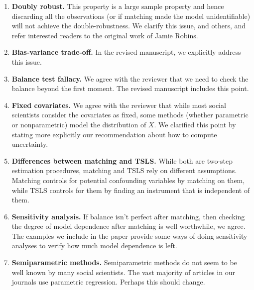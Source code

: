 \documentclass[11pt]{article}
\begin{document}
\begin{enumerate}
\item {\bf Doubly robust.} This property is a large sample property
  and hence discarding all the observations (or if matching made the
  model unidentifiable) will not achieve the double-robustness.  We
  clarify this issue, and others, and refer interested readers to the
  original work of Jamie Robins.
 
\item {\bf Bias-variance trade-off.} In the revised manuscript, we
  explicitly address this issue.

\item {\bf Balance test fallacy.} We agree with the reviewer that we
  need to check the balance beyond the first moment.  The revised
  manuscript includes this point.

\item {\bf Fixed covariates.} We agree with the reviewer that while
  most social scientists consider the covariates as fixed, some
  methods (whether parametric or nonparametric) model the distribution
  of $X$. We clarified this point by stating more explicitly our
  recommendation about how to compute uncertainty.

\item {\bf Differences between matching and TSLS.} While both are
  two-step estimation procedures, matching and TSLS rely on different
  assumptions. Matching controls for potential confounding variables
  by matching on them, while TSLS controls for them by finding an
  instrument that is independent of them.
  
\item {\bf Sensitivity analysis.} If balance isn't perfect after
  matching, then checking the degree of model dependence after
  matching is well worthwhile, we agree.  The examples we include in
  the paper provide some ways of doing sensitivity analyses to verify
  how much model dependence is left.

\item {\bf Semiparametric methods.} Semiparametric methods do not seem
  to be well known by many social scientists.  The vast majority of
  articles in our journals use parametric regression.  Perhaps this
  should change.

\end{enumerate}
\end{document}
